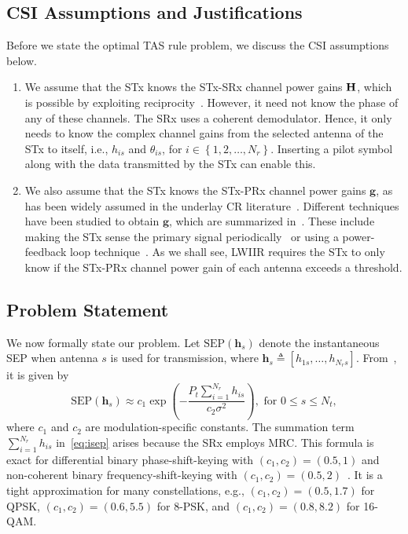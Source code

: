 \documentclass[journal]{IEEEtran}
\newcommand{\define}{\triangleq}
\newcommand{\ie}{{i.e.}}
\newcommand{\mtx}[1]{{\bf #1}} %
\newcommand{\SEP}{\text{SEP}}
\newcommand{\Nt}{{N_t}}
\newcommand{\Nr}{{N_r}}
\newcommand{\Pt}{{P_t}}
\newcommand{\such}{h}
\newcommand{\puch}{g}
\newcommand{\hk}[1]{{\such_{#1}}}
\newcommand{\g}{\mathbf{\puch}}
\newcommand{\noisevar}{\sigma^2}
\newcommand{\cone}{c_{1}}
\newcommand{\ctwo}{c_{2}}
\newcommand{\nropts}{\left\{1,2,\ldots,\Nr\right\}}
\newcommand{\suchph}{\theta}
\newcommand{\thetahk}{\suchph_{is}}
\newcommand{\Hmx}{\mtx{H}}
\newcommand{\sumnr}{\sum_{i=1}^{\Nr}}
\newcommand{\hs}{\mathbf{\such}_{s}}
\begin{document}
\subsection{CSI Assumptions and Justifications}
\label{sec:CSI_assumption}  
Before we state the optimal TAS rule problem, we discuss the  CSI assumptions below. 
\begin{enumerate}
\item We assume that the STx knows the STx-SRx channel power gains $\Hmx$, which is possible by exploiting reciprocity~\cite{Hanif_2015_globecom,Sarvendranath_2013_TCOM,Wang_2010_TWC,RZhang_2009_TWC,Sarvendranath_2014_TCOM}. However, it need not know the phase  of any of these channels. The SRx uses a coherent demodulator. Hence, it only needs to know the complex channel gains from the selected antenna of the STx to itself, \ie, $\hk{is}$ and $\thetahk$, for $i\in\nropts$. Inserting a pilot symbol along with the data transmitted by the STx can enable this.  

\item We also assume that the STx knows the STx-PRx channel power gains $\g$, as has been widely assumed in the underlay CR literature~\cite{Hanif_2015_globecom,Sarvendranath_2013_TCOM,Sarvendranath_2014_TCOM,Kong_2011_JCN,Wang_2010_TWC,RZhang_2009_TWC}. 
Different techniques have been studied to obtain  $\g$, which are summarized in~\cite{Zhang_2017_tcom}. These include making the STx sense the primary signal periodically~\cite{Zhao_2008_TSP} or using a power-feedback loop technique~\cite{RZhang_2008_DSAN}. As we shall see, LWIIR  requires the STx to only know if the STx-PRx channel power gain of each antenna exceeds a threshold.  

\end{enumerate}

\subsection{Problem Statement}
\label{sec:problem_statement}
We now formally state our problem. Let $\SEP(\hs)$ denote the instantaneous SEP when antenna $s$ is used for transmission, where $\hs\define\left[\hk{1s},\ldots,\hk{\Nr s} \right]$. From~\cite[eq. (14)]{Chung_2001_TCom}, it is given by  
\begin{equation}
\SEP(\hs) \approx \cone \exp\left({-\frac{\Pt\sumnr\hk{is}}{\ctwo\noisevar} }\right), \,\,\text{for} \,\, 0\leq s \leq \Nt,
\label{eq:isep}
\end{equation} 
where $\cone$ and $\ctwo$ are modulation-specific constants. The summation term $\sumnr\hk{is}$ in~\eqref{eq:isep} arises because the SRx employs MRC. This formula is exact for differential binary phase-shift-keying  with $(\cone,\ctwo) = (0.5,1)$  and non-coherent binary frequency-shift-keying  with  $(\cone,\ctwo) = (0.5,2)$~\cite{Fakhan_2014_TSP}. It is a tight approximation for many constellations, e.g.,  $(\cone,\ctwo)=(0.5,1.7)$ for QPSK,  $(\cone,\ctwo)=(0.6,5.5)$ for 8-PSK, and  $(\cone,\ctwo )=(0.8,8.2)$ for 16-QAM. 
\end{document}
